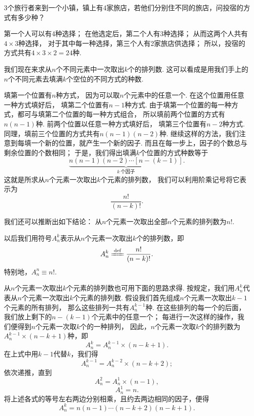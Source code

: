 \begin{example}
3个旅行者来到一个小镇，镇上有4家旅店，若他们分别住不同的旅店，问投宿的方式有多少种？
\begin{solution}
第一个人可以有4种选择；
在他选定后，第二个人有3种选择；
从而这两个人共有\(4 \times 3\)种选择，
对于其中每一种选择，第三个人有2家旅店供选择；
所以，投宿的方式共有\(4 \times 3 \times 2 = 24\)种.
\end{solution}
\end{example}

我们现在来求从\(n\)个不同元素中一次取出\(k\)个的排列数.
这可以看成是用我们手上的\(n\)个不同元素去填满\(k\)个空位的不同方式的种数.

填第一个位置有\(n\)种方式，
因为可以取\(n\)个元素中的任意一个.
在这个位置用任意一种方式填好后，
填第二个位置有\(n-1\)种方式.
由于填第一个位置的每一种方式，都可与填第二个位置的每一种方式组合，
所以填前两个位置的方式有\(n(n-1)\)种.
前两个位置以任意一种方式填好后，
填第三个位置有\(n-2\)种方式.
同理，填前三个位置的方式共有\(n(n-1)(n-2)\)种.
继续这样的方法，我们注意到每填一个新的位置，就产生一个新的因子.
而且在每一步上，因子的个数总与剩余位置的个数相同；
于是，我们得出填满\(k\)个位置的方式种数等于\[
	\underbrace{n(n-1)(n-2)\dotsm[n-(k-1)]}_{k\ \text{个因子}}.
\]
这就是所求从\(n\)个元素一次取出\(k\)个元素的排列数，
我们可以利用阶乘记号将它表示为\[
	\frac{n!}{(n-k)!}.
\]

我们还可以推断出如下结论：
从\(n\)个元素一次取出全部\(n\)个元素的排列数为\(n!\).

以后我们用符号\(A_n^k\)表示从\(n\)个元素一次取出\(k\)个的排列数，即\begin{equation}
	A_n^k \defeq \frac{n!}{(n-k)!}.
\end{equation}
特别地，\(A_n^n \equiv n!\).

从\(n\)个元素一次取出\(k\)个元素的排列数也可用下面的思路求得.
按规定，我们用\(A_n^k\)代表从\(n\)个元素一次取出\(k\)个元素的排列数.
假设我们首先组成\(n\)个元素一次取出\(k-1\)个元素的所有排列，
那么这些排列一共有\(A_n^{k-1}\)种.
在这些排列的每一个的后面，我们放上剩下的\(n-(k-1)\)个元素中的任意一个；
每进行一次这样的操作，我们便得到\(n\)个元素一次取\(k\)个的一种排列，
因此，\(n\)个元素一次取\(k\)个的排列数为\(A_n^{k-1} \times (n-k+1)\)种，即\[
	A_n^k = A_n^{k-1} \times (n-k+1).
\]
在上式中用\(k-1\)代替\(k\)，我们得\[
	A_n^{k-1} = A_n^{k-2} \times (n-k+2);
\]
依次递推，直到\[
	A_n^2 = A_n^1 \times (n-1),
\]\[
	A_n^1 = n.
\]
将上述各式的等号左右两边分别相乘，且约去两边相同的因子，便得\[
	A_n^k = n(n-1)\dotsm(n-k+2)(n-k+1).
\]

